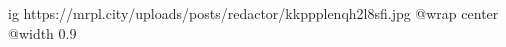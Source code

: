  
 
 
 
 

\ifcmt
  ig https://mrpl.city/uploads/posts/redactor/kkppplenqh2l8sfi.jpg
  @wrap center
  @width 0.9
\fi

